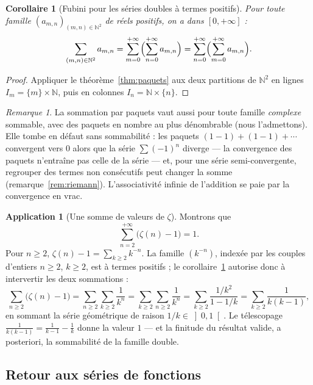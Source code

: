 \documentclass[11pt,a4paper]{article}
\theoremstyle{plain}
\newtheorem{corollaire}[theoreme]{Corollaire}
\theoremstyle{definition}
\newtheorem{application}[theoreme]{Application}
\theoremstyle{remark}
\newtheorem{remarque}[theoreme]{Remarque}
\newcommand{\N}{\mathbb{N}}
\numberwithin{equation}{section}
\begin{document}
\begin{corollaire}[Fubini pour les séries doubles à termes positifs]\label{cor:fubini}
Pour toute famille $(a_{m,n})_{(m,n)\in\N^2}$ de réels positifs, on a dans
$[0,+\infty]$ :
\[
\sum_{(m,n)\in\N^2}a_{m,n}
=\sum_{m=0}^{+\infty}\Bigl(\sum_{n=0}^{+\infty}a_{m,n}\Bigr)
=\sum_{n=0}^{+\infty}\Bigl(\sum_{m=0}^{+\infty}a_{m,n}\Bigr).
\]
\end{corollaire}

\begin{proof}
Appliquer le théorème~\ref{thm:paquets} aux deux partitions de $\N^2$ en
lignes $I_m=\{m\}\times\N$, puis en colonnes $I_n=\N\times\{n\}$.
\end{proof}

\begin{remarque}
La sommation par paquets vaut aussi pour toute famille \emph{complexe}
sommable, avec des paquets en nombre au plus dénombrable (nous
l'admettons). Elle tombe en défaut sans sommabilité : les paquets
$(1-1)+(1-1)+\cdots$ convergent vers $0$ alors que la série $\sum(-1)^n$
diverge --- la convergence des paquets n'entraîne pas celle de la
série --- et, pour une série semi-convergente, regrouper des termes non
consécutifs peut changer la somme (remarque~\ref{rem:riemann}).
L'associativité \og infinie \fg{} de l'addition se paie par la convergence
en vrac.
\end{remarque}

\begin{application}[Une somme de valeurs de $\zeta$]\label{app:zeta-vrac}
Montrons que
\[
\sum_{n=2}^{+\infty}\bigl(\zeta(n)-1\bigr)=1 .
\]
Pour $n\geq 2$, $\zeta(n)-1=\sum_{k\geq 2}k^{-n}$. La famille
$(k^{-n})$, indexée par les couples d'entiers $n\geq 2$, $k\geq 2$, est à
termes positifs ; le corollaire~\ref{cor:fubini} autorise donc à
intervertir les deux sommations :
\[
\sum_{n\geq 2}\bigl(\zeta(n)-1\bigr)
=\sum_{n\geq 2}\sum_{k\geq 2}\frac{1}{k^{n}}
=\sum_{k\geq 2}\sum_{n\geq 2}\frac{1}{k^{n}}
=\sum_{k\geq 2}\frac{1/k^{2}}{1-1/k}
=\sum_{k\geq 2}\frac{1}{k(k-1)} ,
\]
en sommant la série géométrique de raison $1/k\in\left]0,1\right[$. Le
télescopage $\frac{1}{k(k-1)}=\frac{1}{k-1}-\frac{1}{k}$ donne la valeur
$1$ --- et la finitude du résultat valide, a posteriori, la sommabilité de
la famille double.
\end{application}

\subsection{Retour aux séries de fonctions}
\end{document}
